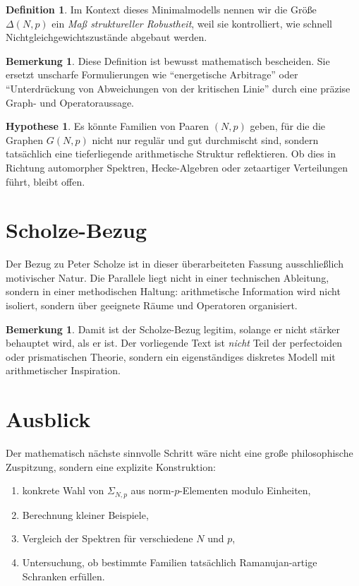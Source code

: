 \documentclass[12pt,a4paper]{article}
\theoremstyle{definition}
\newtheorem{definition}[theorem]{Definition}
\newtheorem{remark}[theorem]{Bemerkung}
\newtheorem{hypothesis}[theorem]{Hypothese}
\begin{document}
	\begin{definition}
		Im Kontext dieses Minimalmodells nennen wir die Größe \(\Delta(N,p)\) ein \emph{Maß struktureller Robustheit}, weil sie kontrolliert, wie schnell Nichtgleichgewichtszustände abgebaut werden.
	\end{definition}
	
	\begin{remark}
		Diese Definition ist bewusst mathematisch bescheiden. Sie ersetzt unscharfe Formulierungen wie ``energetische Arbitrage'' oder ``Unterdrückung von Abweichungen von der kritischen Linie'' durch eine präzise Graph- und Operatoraussage.
	\end{remark}
	
	\begin{hypothesis}
		Es könnte Familien von Paaren \((N,p)\) geben, für die die Graphen \(G(N,p)\) nicht nur regulär und gut durchmischt sind, sondern tatsächlich eine tieferliegende arithmetische Struktur reflektieren. Ob dies in Richtung automorpher Spektren, Hecke-Algebren oder zetaartiger Verteilungen führt, bleibt offen.
	\end{hypothesis}
	
	\section{Scholze-Bezug}
	
	Der Bezug zu Peter Scholze ist in dieser überarbeiteten Fassung ausschließlich motivischer Natur. Die Parallele liegt nicht in einer technischen Ableitung, sondern in einer methodischen Haltung: arithmetische Information wird nicht isoliert, sondern über geeignete Räume und Operatoren organisiert.
	
	\begin{remark}
		Damit ist der Scholze-Bezug legitim, solange er nicht stärker behauptet wird, als er ist. Der vorliegende Text ist \emph{nicht} Teil der perfectoiden oder prismatischen Theorie, sondern ein eigenständiges diskretes Modell mit arithmetischer Inspiration.
	\end{remark}
	
	\section{Ausblick}
	
	Der mathematisch nächste sinnvolle Schritt wäre nicht eine große philosophische Zuspitzung, sondern eine explizite Konstruktion:
	\begin{enumerate}[label=\arabic*.]
		\item konkrete Wahl von \(\Sigma_{N,p}\) aus norm-\(p\)-Elementen modulo Einheiten,
		\item Berechnung kleiner Beispiele,
		\item Vergleich der Spektren für verschiedene \(N\) und \(p\),
		\item Untersuchung, ob bestimmte Familien tatsächlich Ramanujan-artige Schranken erfüllen.
	\end{enumerate}
	
\end{document}
